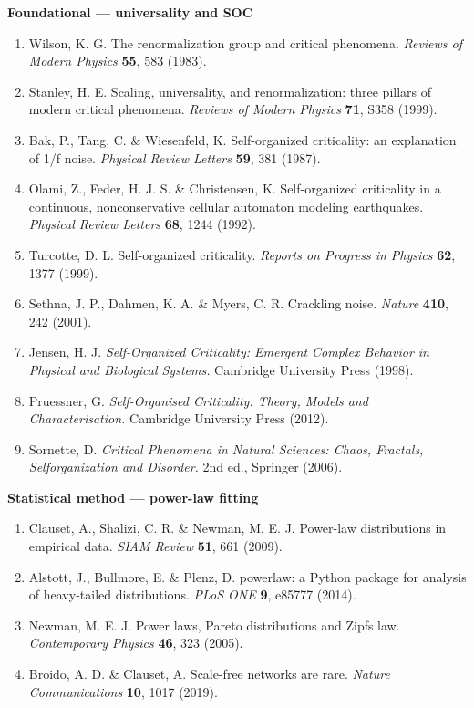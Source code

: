 \documentclass[
  11pt]{article}
\providecommand{\tightlist}{%
  \setlength{\itemsep}{0pt}\setlength{\parskip}{0pt}}
\begin{document}
\textbf{Foundational --- universality and SOC}

\begin{enumerate}
\def\labelenumi{\arabic{enumi}.}
\tightlist
\item
  Wilson, K. G. The renormalization group and critical phenomena.
  \emph{Reviews of Modern Physics} \textbf{55}, 583 (1983).
\item
  Stanley, H. E. Scaling, universality, and renormalization: three
  pillars of modern critical phenomena. \emph{Reviews of Modern Physics}
  \textbf{71}, S358 (1999).
\item
  Bak, P., Tang, C. \& Wiesenfeld, K. Self-organized criticality: an
  explanation of 1/f noise. \emph{Physical Review Letters} \textbf{59},
  381 (1987).
\item
  Olami, Z., Feder, H. J. S. \& Christensen, K. Self-organized
  criticality in a continuous, nonconservative cellular automaton
  modeling earthquakes. \emph{Physical Review Letters} \textbf{68}, 1244
  (1992).
\item
  Turcotte, D. L. Self-organized criticality. \emph{Reports on Progress
  in Physics} \textbf{62}, 1377 (1999).
\item
  Sethna, J. P., Dahmen, K. A. \& Myers, C. R. Crackling noise.
  \emph{Nature} \textbf{410}, 242 (2001).
\item
  Jensen, H. J. \emph{Self-Organized Criticality: Emergent Complex
  Behavior in Physical and Biological Systems.} Cambridge University
  Press (1998).
\item
  Pruessner, G. \emph{Self-Organised Criticality: Theory, Models and
  Characterisation.} Cambridge University Press (2012).
\item
  Sornette, D. \emph{Critical Phenomena in Natural Sciences: Chaos,
  Fractals, Selforganization and Disorder.} 2nd ed., Springer (2006).
\end{enumerate}

\textbf{Statistical method --- power-law fitting}

\begin{enumerate}
\def\labelenumi{\arabic{enumi}.}
\setcounter{enumi}{9}
\tightlist
\item
  Clauset, A., Shalizi, C. R. \& Newman, M. E. J. Power-law
  distributions in empirical data. \emph{SIAM Review} \textbf{51}, 661
  (2009).
\item
  Alstott, J., Bullmore, E. \& Plenz, D. powerlaw: a Python package for
  analysis of heavy-tailed distributions. \emph{PLoS ONE} \textbf{9},
  e85777 (2014).
\item
  Newman, M. E. J. Power laws, Pareto distributions and
  Zipf\textquotesingle s law. \emph{Contemporary Physics} \textbf{46},
  323 (2005).
\item
  Broido, A. D. \& Clauset, A. Scale-free networks are rare.
  \emph{Nature Communications} \textbf{10}, 1017 (2019).
\end{enumerate}
\end{document}
